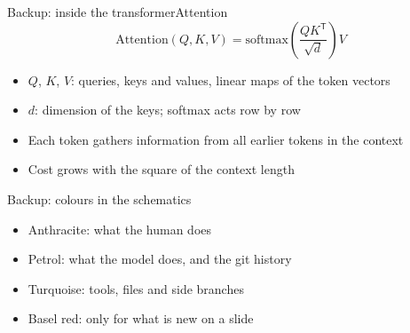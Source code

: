 \backupbegin

\begin{frame}{Backup: inside the transformer}{Attention}
  \begin{equation*}
    \mathrm{Attention}(Q, K, V) = \mathrm{softmax}\!\left(\frac{Q K^{\mathsf{T}}}{\sqrt{d}}\right) V
  \end{equation*}

  \begin{itemize}
    \item $Q$, $K$, $V$: queries, keys and values, linear maps of the token vectors
    \item $d$: dimension of the keys; softmax acts row by row
    \item Each token gathers information from all earlier tokens in the context
    \item Cost grows with the square of the context length
  \end{itemize}

\end{frame}

\begin{frame}{Backup: colours in the schematics}
  \vspace{2ex}
  \begin{center}
  \end{center}
  \vspace{2ex}
  \begin{itemize}
    \item Anthracite: what the human does
    \item Petrol: what the model does, and the git history
    \item Turquoise: tools, files and side branches
    \item Basel red: only for what is new on a slide
  \end{itemize}
\end{frame}

\backupend
